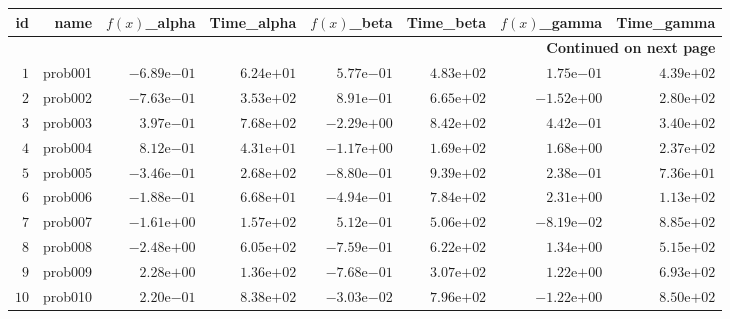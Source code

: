 \documentclass[varwidth=20cm,crop=true]{standalone}
\begin{document}
\begin{longtable}{rrrrrrrr}
  \hline
  id & name & \(f(x)\)\_alpha & Time\_alpha & \(f(x)\)\_beta & Time\_beta & \(f(x)\)\_gamma & Time\_gamma \\\hline
  \endhead
  \hline
  \multicolumn{8}{r}{{\bfseries Continued on next page}}\\
  \hline
  \endfoot
  \endlastfoot
  \(     1\) & prob001 & \(-6.89\)e\(-01\) & \( 6.24\)e\(+01\) & \( 5.77\)e\(-01\) & \( 4.83\)e\(+02\) & \( 1.75\)e\(-01\) & \( 4.39\)e\(+02\) \\
  \(     2\) & prob002 & \(-7.63\)e\(-01\) & \( 3.53\)e\(+02\) & \( 8.91\)e\(-01\) & \( 6.65\)e\(+02\) & \(-1.52\)e\(+00\) & \( 2.80\)e\(+02\) \\
  \(     3\) & prob003 & \( 3.97\)e\(-01\) & \( 7.68\)e\(+02\) & \(-2.29\)e\(+00\) & \( 8.42\)e\(+02\) & \( 4.42\)e\(-01\) & \( 3.40\)e\(+02\) \\
  \(     4\) & prob004 & \( 8.12\)e\(-01\) & \( 4.31\)e\(+01\) & \(-1.17\)e\(+00\) & \( 1.69\)e\(+02\) & \( 1.68\)e\(+00\) & \( 2.37\)e\(+02\) \\
  \(     5\) & prob005 & \(-3.46\)e\(-01\) & \( 2.68\)e\(+02\) & \(-8.80\)e\(-01\) & \( 9.39\)e\(+02\) & \( 2.38\)e\(-01\) & \( 7.36\)e\(+01\) \\
  \(     6\) & prob006 & \(-1.88\)e\(-01\) & \( 6.68\)e\(+01\) & \(-4.94\)e\(-01\) & \( 7.84\)e\(+02\) & \( 2.31\)e\(+00\) & \( 1.13\)e\(+02\) \\
  \(     7\) & prob007 & \(-1.61\)e\(+00\) & \( 1.57\)e\(+02\) & \( 5.12\)e\(-01\) & \( 5.06\)e\(+02\) & \(-8.19\)e\(-02\) & \( 8.85\)e\(+02\) \\
  \(     8\) & prob008 & \(-2.48\)e\(+00\) & \( 6.05\)e\(+02\) & \(-7.59\)e\(-01\) & \( 6.22\)e\(+02\) & \( 1.34\)e\(+00\) & \( 5.15\)e\(+02\) \\
  \(     9\) & prob009 & \( 2.28\)e\(+00\) & \( 1.36\)e\(+02\) & \(-7.68\)e\(-01\) & \( 3.07\)e\(+02\) & \( 1.22\)e\(+00\) & \( 6.93\)e\(+02\) \\
  \(    10\) & prob010 & \( 2.20\)e\(-01\) & \( 8.38\)e\(+02\) & \(-3.03\)e\(-02\) & \( 7.96\)e\(+02\) & \(-1.22\)e\(+00\) & \( 8.50\)e\(+02\) \\\hline
\end{longtable}
\end{document}
